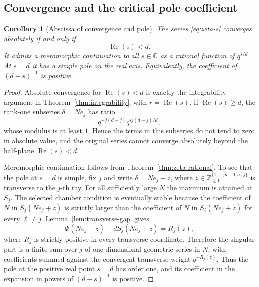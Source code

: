 \documentclass[11pt]{amsart}
\newcommand{\ZZ}{\mathbb Z}
\newcommand{\CC}{\mathbb C}
\theoremstyle{plain}
\newtheorem{corollary}[theorem]{Corollary}
\theoremstyle{definition}
\numberwithin{equation}{section}
\begin{document}
\subsection{Convergence and the critical pole coefficient}

\begin{corollary}[Abscissa of convergence and pole]\label{cor:zeta-abscissa}
The series \eqref{eq:zeta-s} converges absolutely if and only if
\[
  \operatorname{Re}(s)<d.
\]
It admits a meromorphic continuation to all $s\in\CC$ as a rational function of $q^{s/d}$.
At $s=d$ it has a simple pole on the real axis.  Equivalently, the coefficient of
$(d-s)^{-1}$ is positive.
\end{corollary}

\begin{proof}
Absolute convergence for $\operatorname{Re}(s)<d$ is exactly the integrability argument in
Theorem~\ref{thm:integrability}, with $r=\operatorname{Re}(s)$.  If $\operatorname{Re}(s)\ge d$, the
rank-one subseries $\delta=Ne_j$ has ratio
\[
  q^{-j(d-j)}q^{s j(d-j)/d},
\]
whose modulus is at least $1$.  Hence the terms in this subseries do not tend to zero in
absolute value, and the original series cannot converge absolutely beyond the half-plane
$\operatorname{Re}(s)<d$.

Meromorphic continuation follows from Theorem~\ref{thm:zeta-rational}.  To see that the pole at
$s=d$ is simple, fix $j$ and write $\delta=Ne_j+z$, where
$z\in\ZZ_{\ge0}^{\{1,\ldots,d-1\}\setminus\{j\}}$ is transverse to the $j$-th ray.  For
all sufficiently large $N$ the maximum is attained at $S_j$.  The selected chamber condition
is eventually stable because the coefficient of $N$ in $S_j(Ne_j+z)$ is strictly larger
than the coefficient of $N$ in $S_\ell(Ne_j+z)$ for every $\ell\ne j$.  Lemma~\ref{lem:transverse-gap}
gives
\[
  \Phi(Ne_j+z)-dS_j(Ne_j+z)=R_j(z),
\]
where $R_j$ is strictly positive in every transverse coordinate.  Therefore the singular
part is a finite sum over $j$ of one-dimensional geometric series in $N$, with coefficients
summed against the convergent transverse weight $q^{-R_j(z)}$.  Thus the pole at the
positive real point $s=d$ has order one, and its coefficient in the expansion in powers of
$(d-s)^{-1}$ is positive.
\end{proof}
\end{document}
